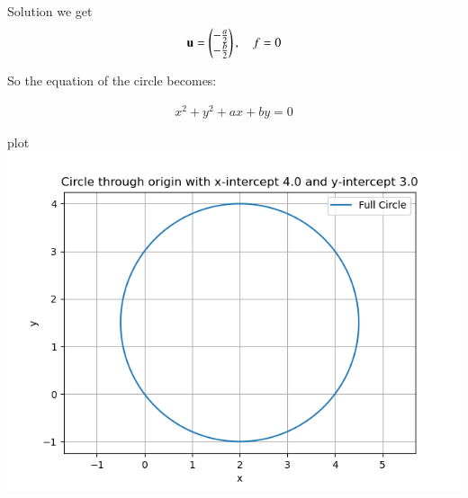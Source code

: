 \documentclass{beamer}
\begin{document}
\begin{frame}{Solution}
we get
\begin{align}
\mathbf{u} = \begin{pmatrix} -\frac{a}{2} \\ -\frac{b}{2} \end{pmatrix}, \quad f = 0
\end{align}

So the equation of the circle becomes:


\begin{align}
x^2 + y^2 + ax + by = 0
\end{align}
\end{frame}
\begin{frame}{plot}
\centering
    \includegraphics[width=\columnwidth, height=0.8\textheight, keepaspectratio]{../figs/fig.png}     
\end{frame}
\end{document}
